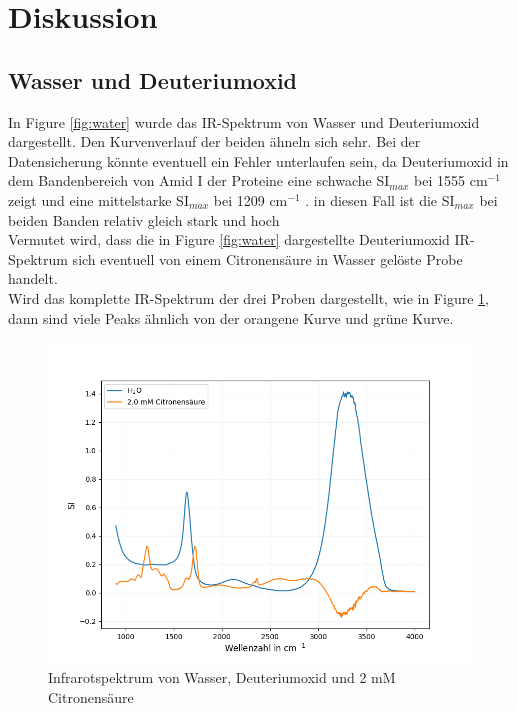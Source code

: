 \documentclass[10pt,a4paper]{article}
\begin{document}
	
	\section{Diskussion}
		\subsection{Wasser und Deuteriumoxid}
			In Figure \ref{fig:water} wurde das IR-Spektrum von Wasser und Deuteriumoxid dargestellt. Den Kurvenverlauf der beiden ähneln sich sehr. Bei der Datensicherung könnte eventuell ein Fehler unterlaufen sein, da Deuteriumoxid in dem Bandenbereich von Amid I der Proteine eine schwache SI$_{max}$  bei 1555 cm$^{-1}$  \cite{infrared_d2o_h2o} zeigt und eine mittelstarke SI$_{max}$  bei 1209 cm$^{-1}$  \cite{infrared_d2o_h2o}. in diesen Fall ist die SI$_{max}$ bei beiden Banden relativ gleich stark und hoch\\
			Vermutet wird, dass die in Figure \ref{fig:water} dargestellte Deuteriumoxid IR-Spektrum sich eventuell von einem Citronensäure in Wasser gelöste Probe handelt.\\
			Wird das komplette IR-Spektrum der drei Proben dargestellt, wie in Figure \ref{fig:wasser_Citrat_full}, dann sind viele Peaks ähnlich von der orangene Kurve und grüne Kurve.\\
			
			\begin{figure}[H]
				\centering
				\includegraphics[scale=0.55]{water_citricacid.png}
				\caption{Infrarotspektrum von Wasser, Deuteriumoxid und 2 mM Citronensäure}
				\label{fig:wasser_Citrat_full}
			\end{figure}
			
\end{document}
